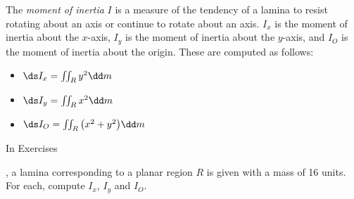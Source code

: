 \begin{exerciseset}{The \textit{moment of inertia} $I$ is a measure of the tendency of a lamina to resist rotating about an axis or continue to rotate about an axis. $I_x$ is the moment of inertia about the $x$-axis, $I_y$ is the moment of inertia about the $y$-axis, and $I_O$ is the moment of inertia about the origin. These are computed as follows:
\begin{itemize}
	\item $\ds I_x = \iint_R y^2\dd m$
	\item	$\ds I_y = \iint_R x^2\dd m$
	\item	$\ds I_O = \iint_R \big(x^2+y^2\big)\dd m$
\end{itemize} \noindent In Exercises} 
{,  a lamina corresponding to a planar region $R$ is given with a mass of 16 units. For each, compute $I_x$, $I_y$ and $I_O$.}





\end{exerciseset}
